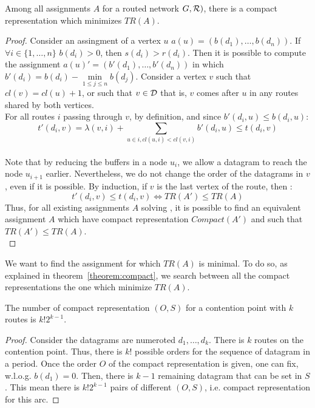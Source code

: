 \documentclass[english]{article}
\begin{document}
\begin{theorem}
Among all assignments $A$ for a routed network $G,{\cal R})$, there is a compact representation which minimizes $TR(A)$.
\label{theorem:compact}
\end{theorem}
\begin{proof}
Consider an assingment of a vertex $u$ $a(u) = (b(d_1),\dots,b(d_n))$. If $\forall i \in \{1,\ldots,n\}$ $b(d_i) > 0 $, then $s(d_i) > r(d_i)$. Then it is possible to compute the assignment $a(u)' = (b'(d_1),\dots,b'(d_n))$ in which $b'(d_i) = b(d_i) - \min\limits_{ 1\leq j \leq n} b(d_j)$. Consider a vertex $v$ such that $cl(v) = cl(u) +1$, or such that $v \in \cal{D}$ that is, $v$ comes after $u$ in any routes shared by both vertices.\\
For all routes $i$ passing through $v$, by definition, and since $b'(d_i,u) \leq b(d_i,u)$: $$t'(d_i,v) = \lambda(v,i) + \sum_{u \in i, cl(u,i) < cl(v,i)} b'(d_i,u)  \leq t(d_i,v)$$\\
Note that by reducing the buffers in a node $u_i$, we allow a datagram to reach the node $u_{i+1}$ earlier. Nevertheless, we do not change the order of the datagrams in $v$, even if it is possible.
By induction, if $v$ is the last vertex of the route, then : $$t'(d_i,v) \leq t(d_i,v) \Leftrightarrow TR(A') \leq TR(A)$$
Thus, for all existing assignments $A$ solving \spall, it is possible to find an equivalent assignment $A$ which have compact representation $Compact(A')$ and such that $TR(A') \leq TR(A)$.\\
\end{proof}


We want to find the assignment for which $TR(A)$ is minimal. To do so, as explained in theorem~\ref{theorem:compact}, we search between all the compact representations the one which minimize $TR(A)$.

\begin{lemma}
 The number of compact representation $(O,S)$ for a contention point with $k$ routes is $k!2^{k-1}$.
 \label{lemma:numberarcs}
\end{lemma}
\begin{proof}
Consider the datagrams are numeroted $d_1,\ldots,d_k$.
 There is $k$ routes on the contention point. Thus, there is $k!$ possible orders for the sequence of datagram in a period.
 Once the order $O$ of the compact representation is given, one can fix, w.l.o.g. $b(d_1) = 0$.
 Then, there is $k-1$ remaining datagram that can be set in $S$.
 This mean there is $k!2^{k-1}$ pairs of different $(O,S)$, i.e. compact representation for this arc.
\end{proof}
\end{document}
